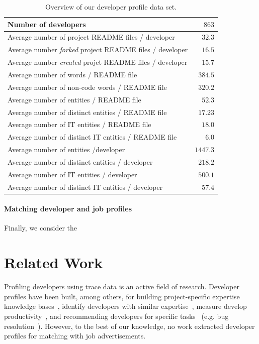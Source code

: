 \documentclass[conference]{IEEEtran}
\begin{document}
\begin{table}[htb]
\centering
\begin{tabular}{lr}
\toprule
Number of developers									& $863$\\
\midrule
Average number of project README files / developer	& $32.3$\\
Average number \emph{forked} project README files / developer	& $16.5$\\
Average number \emph{created} projet README files / developer & $15.7$\\
\midrule
Average number of words / README file		& $384.5$\\
Average number of non-code words / README file 	& $320.2$\\
\midrule
Average number of entities / README file 					& $52.3$\\
Average number of distinct entities / README file 					& $17.23$\\
\midrule
Average number of IT entities / README file				& $18.0$\\
Average number of distinct IT entities / README file				& $6.0$\\
\midrule
Average number of entities /developer						& $1447.3$\\
Average number of distinct entities / developer			& $218.2$\\
Average number of IT entities / developer			& $500.1$\\
Average number of distinct IT entities / developer		& $57.4$\\
\bottomrule
\end{tabular}
\caption{Overview of our developer profile data set.}
\label{tab:developers}
\end{table}



\paragraph{Matching developer and job profiles}
Finally, we consider the 


\section{Related Work}

Profiling developers using trace data is an active field of research. Developer
profiles have been built, among others, for building project-specific expertise
knowledge bases~\cite{Mocku02}, identify developers with similar
expertise~\cite{Schuler08}, measure develop productivity~\cite{Gousi08},
and recommending developers for specific tasks~\cite{ying14} (e.g. bug
resolution~\cite{Anvik06}). However, to the best of our knowledge, no work
extracted developer profiles for matching with job advertisements.
\end{document}
